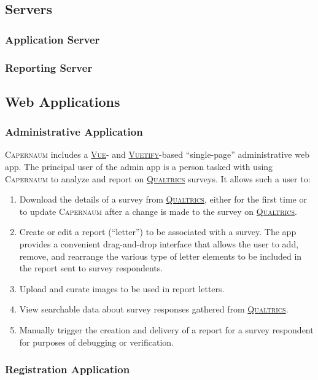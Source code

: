 \documentclass{article}
\newcommand{\caper}{\textsc{Capernaum}}
\newcommand{\qual}{\href{https://www.qualtrics.com/}{\textsc{Qualtrics}}}
\newcommand{\vuetify}{\href{https://vuetifyjs.com/}{\textsc{Vuetify}}}
\newcommand{\vue}{\href{https://vuejs.org/}{\textsc{Vue}}}
\begin{document}
\subsection{Servers}
\label{sec:servers}

\subsubsection{Application Server}
\label{sec:application-server}

\subsubsection{Reporting Server}
\label{sec:reporting-server}

\subsection{Web Applications}
\label{sec:web-apps}

\subsubsection{Administrative Application}
\label{sec:admin-app}

\caper{} includes a \vue{}- and \vuetify{}-based
``single-page''
administrative web app.
The principal user of the admin app
is a person tasked with using \caper{}
to analyze and report on \qual{} surveys.
It allows such a user to:
\begin{enumerate}
\item Download the details of a survey from \qual{},
  either for the first time or to update \caper{} after a change is made to the survey on \qual.
\item Create or edit a report (``letter'') to be associated with a survey.
  The app provides a convenient drag-and-drop interface
  that allows the user to add, remove, and rearrange the various type of
  letter elements to be included in the report sent to survey respondents.
\item Upload and curate images to be used in report letters.
\item View searchable data about survey responses gathered from \qual.
\item Manually trigger the creation and delivery of a report for a survey respondent
  for purposes of debugging or verification.
\end{enumerate}

\subsubsection{Registration Application}
\label{sec:group-app}
\end{document}
